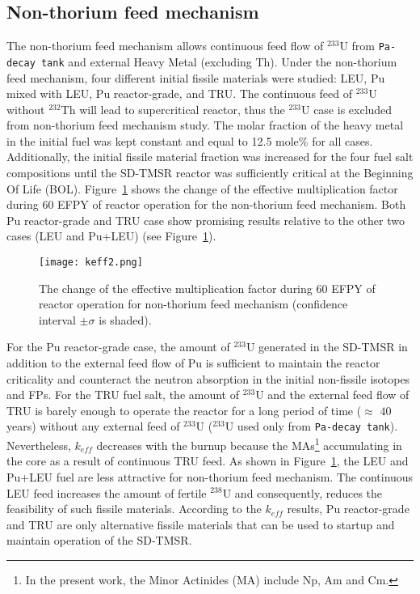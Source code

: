 \subsection{Non-thorium feed mechanism}

The non-thorium feed mechanism allows continuous feed flow of 
$^{233}$U from \texttt{Pa-decay tank} and external Heavy Metal (excluding Th). 
Under the non-thorium feed mechanism, four different initial fissile materials were studied: \gls{LEU}, Pu mixed with \gls{LEU}, Pu reactor-grade, and \gls{TRU}. The continuous feed of $^{233}$U 
without $^{232}$Th will lead to supercritical reactor, thus the $^{233}$U case 
is excluded from non-thorium feed mechanism study.
The molar fraction of the heavy metal in the initial fuel was kept constant and equal to 12.5 mole\% for all cases. 
Additionally, the initial fissile material fraction was increased for the four fuel 
salt compositions until the \gls{SD-TMSR} reactor was sufficiently critical at 
the Beginning Of Life (BOL). 
Figure~\ref{fig:keff2} shows the change of the effective multiplication factor 
during 60 \gls{EFPY} of reactor operation for the non-thorium feed mechanism. Both Pu reactor-grade and TRU case 
show promising results relative to the other two cases (LEU and Pu+LEU) (see Figure~\ref{fig:keff2}). 
\begin{figure}
	\centering
	\texttt{[image: keff2.png]}
			\vspace{-0.5in}
	\caption{The change of the effective multiplication factor during 60 
	\gls{EFPY} of reactor operation for non-thorium feed mechanism (confidence 
	interval $\pm\sigma$ is shaded).} 
	\label{fig:keff2}
\end{figure}

For the Pu reactor-grade case, the amount of $^{233}$U generated in the \gls{SD-TMSR} in addition to the external feed flow of Pu is sufficient to maintain the reactor criticality and counteract the neutron absorption in the initial non-fissile isotopes and FPs. 
For the \gls{TRU} fuel salt, the amount of 
$^{233}$U and the external feed flow of TRU is barely enough to operate the 
reactor for a long period of time ($\approx$ $40$ years) without any 
external feed of $^{233}$U ($^{233}$U used only from \texttt{Pa-decay tank}). Nevertheless, $k_{eff}$ decreases with the burnup 
because the \glspl{MA}\footnote{In the present work, the Minor Actinides 
(MA) include Np, Am and Cm.} accumulating in the core as a result of 
continuous TRU feed. As shown in Figure~\ref{fig:keff2}, the LEU and Pu+LEU 
fuel are less attractive for non-thorium feed mechanism. The continuous LEU 
feed increases the amount of fertile $^{238}$U and consequently, reduces the 
feasibility of such fissile materials. According to the $k_{eff}$ 
results, Pu reactor-grade and TRU are only alternative fissile materials that  
can be used to startup and maintain operation of the \gls{SD-TMSR}.


